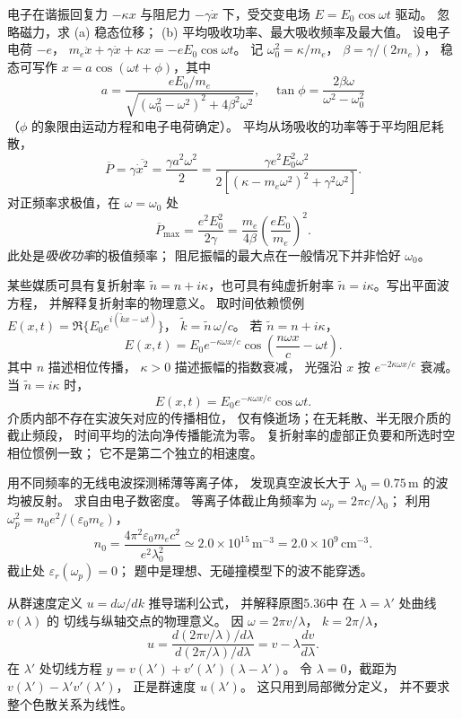 电子在谐振回复力 $-\kappa x$ 与阻尼力
$-\gamma\dot x$ 下，受交变电场
$E=E_0\cos\omega t$ 驱动。
忽略磁力，求 (a) 稳态位移；
(b) 平均吸收功率、最大吸收频率及最大值。
\exsolution
设电子电荷 $-e$，
$m_e\ddot x+\gamma\dot x+\kappa x=-eE_0\cos\omega t$。
记 $\omega_0^2=\kappa/m_e$，
$\beta=\gamma/(2m_e)$，
稳态可写作 $x=a\cos(\omega t+\phi)$，其中
\[
 \boxed{a=\frac{eE_0/m_e}
 {\sqrt{(\omega_0^2-\omega^2)^2+4\beta^2\omega^2}}},
 \quad
 \tan\phi=\frac{2\beta\omega}{\omega^2-\omega_0^2}
\]
（$\phi$ 的象限由运动方程和电子电荷确定）。
平均从场吸收的功率等于平均阻尼耗散，
\[
 \overline P=\gamma\overline{\dot x^2}
 =\frac{\gamma a^2\omega^2}{2}
 =\boxed{\frac{\gamma e^2E_0^2\omega^2}
 {2[(\kappa-m_e\omega^2)^2+\gamma^2\omega^2]}}.
\]
对正频率求极值，在 $\omega=\omega_0$ 处
\[
 \boxed{\overline P_{\max}=\frac{e^2E_0^2}{2\gamma}
 =\frac{m_e}{4\beta}\left(\frac{eE_0}{m_e}\right)^2}.
\]
\excheck 此处是\emph{吸收功率}的极值频率；
阻尼振幅的最大点在一般情况下并非恰好 $\omega_0$。

某些媒质可具有复折射率
$\tilde n=n+i\kappa$，也可具有纯虚折射率
$\tilde n=i\kappa$。写出平面波方程，
并解释复折射率的物理意义。
\exsolution
取时间依赖惯例
$E(x,t)=\Re\{E_0e^{i(\tilde kx-\omega t)}\}$，
$\tilde k=\tilde n\,\omega/c$。
若 $\tilde n=n+i\kappa$，
\[
 \boxed{E(x,t)=E_0 e^{-\kappa\omega x/c}
 \cos\left(\frac{n\omega x}{c}-\omega t\right)}.
\]
其中 $n$ 描述相位传播，
$\kappa>0$ 描述振幅的指数衰减，
光强沿 $x$ 按 $e^{-2\kappa\omega x/c}$ 衰减。
当 $\tilde n=i\kappa$ 时，
\[
 \boxed{E(x,t)=E_0e^{-\kappa\omega x/c}\cos\omega t}.
\]
介质内部不存在实波矢对应的传播相位，
仅有倏逝场；在无耗散、半无限介质的截止频段，
时间平均的法向净传播能流为零。
\excheck 复折射率的虚部正负要和所选时空相位惯例一致；
它不是第二个独立的相速度。

用不同频率的无线电波探测稀薄等离子体，
发现真空波长大于
$\lambda_0=0.75\,\mathrm m$ 的波均被反射。
求自由电子数密度。
\exsolution
等离子体截止角频率为
$\omega_p=2\pi c/\lambda_0$；
利用 $\omega_p^2=n_0e^2/(\varepsilon_0m_e)$，
\[
 \boxed{n_0=
 \frac{4\pi^2\varepsilon_0m_ec^2}
 {e^2\lambda_0^2}
 \simeq2.0\times10^{15}\,\mathrm{m^{-3}}
 =2.0\times10^9\,\mathrm{cm^{-3}}}.
\]
\excheck 截止处 $\varepsilon_r(\omega_p)=0$；
题中是理想、无碰撞模型下的波不能穿透。

从群速度定义 $u=d\omega/dk$ 推导瑞利公式，
并解释原图5.36中
在 $\lambda=\lambda'$ 处曲线 $v(\lambda)$ 的
切线与纵轴交点的物理意义。
\exsolution
因 $\omega=2\pi v/\lambda$，
$k=2\pi/\lambda$，
\[
 u=\frac{d(2\pi v/\lambda)/d\lambda}
 {d(2\pi/\lambda)/d\lambda}
 =\boxed{v-\lambda\frac{dv}{d\lambda}}.
\]
在 $\lambda'$ 处切线方程
$y=v(\lambda')+v'(\lambda')(\lambda-\lambda')$。
令 $\lambda=0$，截距为
$v(\lambda')-\lambda'v'(\lambda')$，
正是群速度 $u(\lambda')$。
\excheck 这只用到局部微分定义，
并不要求整个色散关系为线性。

